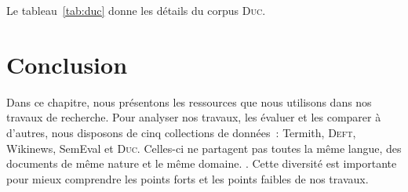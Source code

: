    Le tableau~\ref{tab:duc} donne les détails du corpus \textsc{Duc}.

    \begin{table}[!h]
      \centering

      \caption{Corpus \textsc{Duc}
               \label{tab:duc}}
    \end{table}


  \section{Conclusion}
  \label{sec:main-data_description-conclusion}
    Dans ce chapitre, nous présentons les ressources que nous utilisons dans nos
    travaux de recherche. Pour analyser nos travaux, les évaluer et les
    comparer à d'autres, nous disposons de cinq collections de données~:
    Termith, \textsc{Deft}, Wikinews, SemEval et \textsc{Duc}. Celles-ci ne
    partagent pas toutes la même langue, des documents de même nature et le même
    domaine. .
    Cette diversité est importante pour mieux comprendre les points forts et les
    points faibles de nos travaux.

